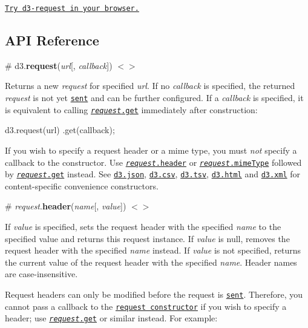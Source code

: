 \href{https://tonicdev.com/npm/d3-request}{\tt Try d3-\/request in your browser.}

\subsection*{A\+PI Reference}

\label{_request}%
\# d3.{\bfseries request}({\itshape url}\mbox{[}, {\itshape callback}\mbox{]}) \href{https://github.com/d3/d3-request/blob/master/src/request.js#L4}{\tt $<$$>$}

Returns a new {\itshape request} for specified {\itshape url}. If no {\itshape callback} is specified, the returned {\itshape request} is not yet \href{#request_send}{\tt sent} and can be further configured. If a {\itshape callback} is specified, it is equivalent to calling \href{#request_get}{\tt {\itshape request}.get} immediately after construction\+:


\begin{DoxyCode}
d3.request(url)
    .get(callback);
\end{DoxyCode}


If you wish to specify a request header or a mime type, you must {\itshape not} specify a callback to the constructor. Use \href{#request_header}{\tt {\itshape request}.header} or \href{#request_mimeType}{\tt {\itshape request}.mime\+Type} followed by \href{#request_get}{\tt {\itshape request}.get} instead. See \href{#json}{\tt d3.\+json}, \href{#csv}{\tt d3.\+csv}, \href{#tsv}{\tt d3.\+tsv}, \href{#html}{\tt d3.\+html} and \href{#xml}{\tt d3.\+xml} for content-\/specific convenience constructors.

\label{_request_header}%
\# {\itshape request}.{\bfseries header}({\itshape name}\mbox{[}, {\itshape value}\mbox{]}) \href{https://github.com/d3/d3-request/blob/master/src/request.js#L51}{\tt $<$$>$}

If {\itshape value} is specified, sets the request header with the specified {\itshape name} to the specified value and returns this request instance. If {\itshape value} is null, removes the request header with the specified {\itshape name} instead. If {\itshape value} is not specified, returns the current value of the request header with the specified {\itshape name}. Header names are case-\/insensitive.

Request headers can only be modified before the request is \href{#request_send}{\tt sent}. Therefore, you cannot pass a callback to the \href{#request}{\tt request constructor} if you wish to specify a header; use \href{#request_get}{\tt {\itshape request}.get} or similar instead. For example\+:


